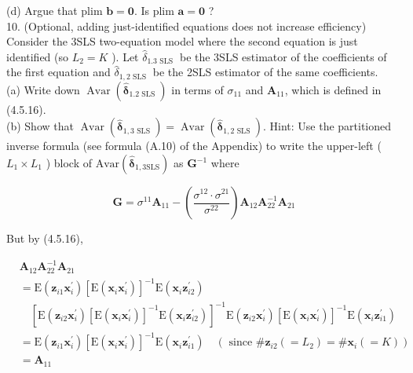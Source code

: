 \documentclass[10pt]{article}
\begin{document}
(d) Argue that plim $\mathbf{b}=\mathbf{0}$. Is plim $\mathbf{a}=\mathbf{0}$ ?\\
10. (Optional, adding just-identified equations does not increase efficiency) Consider the 3SLS two-equation model where the second equation is just identified (so $L_{2}=K$ ). Let $\hat{\delta}_{1.3 \text { SLS }}$ be the 3SLS estimator of the coefficients of the first equation and $\hat{\delta}_{1,2 \text { SLS }}$ be the 2SLS estimator of the same coefficients.\\
(a) Write down $\operatorname{Avar}\left(\hat{\boldsymbol{\delta}}_{1.2 \text { SLS }}\right)$ in terms of $\sigma_{11}$ and $\mathbf{A}_{11}$, which is defined in (4.5.16).\\
(b) Show that $\operatorname{Avar}\left(\hat{\boldsymbol{\delta}}_{1,3 \text { SLS }}\right)=\operatorname{Avar}\left(\hat{\boldsymbol{\delta}}_{1,2 \text { SLS }}\right)$. Hint: Use the partitioned inverse formula (see formula (A.10) of the Appendix) to write the upper-left ( $L_{1} \times L_{1}$ ) block of $\mathrm{Avar}\left(\hat{\boldsymbol{\delta}}_{1,3 \mathrm{SLS}}\right)$ as $\mathbf{G}^{-1}$ where

$$
\mathbf{G}=\sigma^{11} \mathbf{A}_{11}-\left(\frac{\sigma^{12} \cdot \sigma^{21}}{\sigma^{22}}\right) \mathbf{A}_{12} \mathbf{A}_{22}^{-1} \mathbf{A}_{21}
$$

But by (4.5.16),

$$
\begin{aligned}
& \mathbf{A}_{12} \mathbf{A}_{22}^{-1} \mathbf{A}_{21} \\
& =\mathrm{E}\left(\mathbf{z}_{i 1} \mathbf{x}_{i}^{\prime}\right)\left[\mathrm{E}\left(\mathbf{x}_{i} \mathbf{x}_{i}^{\prime}\right)\right]^{-1} \mathrm{E}\left(\mathbf{x}_{i} \mathbf{z}_{i 2}^{\prime}\right) \\
& \quad\left[\mathrm{E}\left(\mathbf{z}_{i 2} \mathbf{x}_{i}^{\prime}\right)\left[\mathrm{E}\left(\mathbf{x}_{i} \mathbf{x}_{i}^{\prime}\right)\right]^{-1} \mathrm{E}\left(\mathbf{x}_{i} \mathbf{z}_{i 2}^{\prime}\right)\right]^{-1} \mathrm{E}\left(\mathbf{z}_{i 2} \mathbf{x}_{i}^{\prime}\right)\left[\mathrm{E}\left(\mathbf{x}_{i} \mathbf{x}_{i}^{\prime}\right)\right]^{-1} \mathrm{E}\left(\mathbf{x}_{i} \mathbf{z}_{i 1}^{\prime}\right) \\
& =\mathrm{E}\left(\mathbf{z}_{i 1} \mathbf{x}_{i}^{\prime}\right)\left[\mathrm{E}\left(\mathbf{x}_{i} \mathbf{x}_{i}^{\prime}\right)\right]^{-1} \mathrm{E}\left(\mathbf{x}_{i} \mathbf{z}_{i 1}^{\prime}\right) \quad\left(\text { since } \# \mathbf{z}_{i 2}\left(=L_{2}\right)=\# \mathbf{x}_{i}(=K)\right) \\
& =\mathbf{A}_{11}
\end{aligned}
$$
\end{document}

